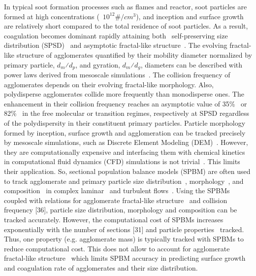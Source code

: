 In typical soot formation processes such as flames and reactor, soot particles are formed at high concentrations (~$10^{12} \#/cm^3$), and inception and surface growth are relatively short compared to the total residence of soot particles. As a result, coagulation becomes dominant rapidly attaining both~\citep{Goudeli2016}
self-preserving size distribution (SPSD)~\citep{lai1972self} and asymptotic fractal-like structure~\citep{mountain1986simulation}.
The evolving fractal-like structure of agglomerates quantified by their mobility diameter normalized by primary particle, $d_m$⁄$d_p$, and gyration, $d_m$⁄$d_g$, diameters can be described with power laws derived from mesoscale simulations~\citep{Kelesidis2017}. The collision frequency of agglomerates depends on their evolving fractal-like morphology. Also, polydisperse agglomerates collide more frequently than monodisperse ones. The enhancement in their collision frequency reaches an asymptotic value of 35\%~\citep{Goudeli2016} or 82\%~\citep{kelesidis2021self} in the free molecular or transition regimes, respectively at SPSD regardless of the polydispersity in their constituent primary particles. Particle morphology formed by inception, surface growth and agglomeration can be tracked precisely by mesoscale simulations, such as Discrete Element Modeling (DEM)~\citep{Kelesidis2017Flame}. However, they are computationally expensive and interfacing them with chemical kinetics in computational fluid dynamics (CFD) simulations is not trivial~\citep{kelesidis2021perspective}. This limits their application. So, sectional population balance models (SPBM) are often used to track agglomerate and primary particle size distribution~\citep{Xiong1993}, morphology~\citep{park2005aerosol}, and composition~\citep{kholghy2016core} in complex laminar~\citep{kholghy2016core} and turbulent flows~\citep{schiener2019transported}. Using the SPBMs coupled with relations for agglomerate fractal-like structure~\citep{matsoukas1991dynamics} and collision frequency [36], particle size distribution, morphology and composition can be tracked accurately. However, the computational cost of SPBMs increases exponentially with the number of sections [31] and particle properties~\citep{kholghy2016core} tracked. Thus, one property (e.g. agglomerate mass) is typically tracked with SPBMs to reduce computational cost. This does not allow to account for agglomerate fractal-like structure~\citep{smooke2005soot, aubagnac2018soot} which limits SPBM accuracy in predicting surface growth and coagulation rate of agglomerates and their size distribution.

